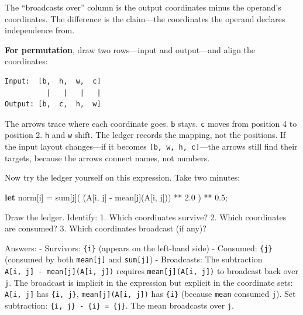 \documentclass[11pt,titlepage]{article}
\newenvironment{Shaded}{}{}
\newcommand{\DecValTok}[1]{\textcolor[rgb]{0.25,0.63,0.44}{#1}}
\newcommand{\KeywordTok}[1]{\textcolor[rgb]{0.00,0.44,0.13}{\textbf{#1}}}
\newcommand{\NormalTok}[1]{#1}
\newcommand{\OperatorTok}[1]{\textcolor[rgb]{0.40,0.40,0.40}{#1}}
\begin{document}
The ``broadcasts over'' column is the output coordinates minus the
operand's coordinates. The difference is the claim---the coordinates the
operand declares independence from.

\textbf{For permutation}, draw two rows---input and output---and align
the coordinates:

\begin{verbatim}
Input:  [b,  h,  w,  c]
          |   |   |   |
Output: [b,  c,  h,  w]
\end{verbatim}

The arrows trace where each coordinate goes. \texttt{b} stays.
\texttt{c} moves from position 4 to position 2. \texttt{h} and
\texttt{w} shift. The ledger records the mapping, not the positions. If
the input layout changes---if it becomes
\texttt{{[}b,\ w,\ h,\ c{]}}---the arrows still find their targets,
because the arrows connect names, not numbers.

Now try the ledger yourself on this expression. Take two minutes:

\begin{Shaded}
\begin{Highlighting}[]
\KeywordTok{let}\NormalTok{ norm}\OperatorTok{[}\NormalTok{i}\OperatorTok{]}\NormalTok{ = sum}\OperatorTok{[}\NormalTok{j}\OperatorTok{]}\NormalTok{( (A}\OperatorTok{[}\NormalTok{i, j}\OperatorTok{]}\NormalTok{ - mean}\OperatorTok{[}\NormalTok{j}\OperatorTok{]}\NormalTok{(A}\OperatorTok{[}\NormalTok{i, j}\OperatorTok{]}\NormalTok{)) ** }\DecValTok{2.0}\NormalTok{ ) ** }\DecValTok{0.5}\NormalTok{;}
\end{Highlighting}
\end{Shaded}

Draw the ledger. Identify: 1. Which coordinates survive? 2. Which
coordinates are consumed? 3. Which coordinates broadcast (if any)?

Answers: - Survivors: \texttt{\{i\}} (appears on the left-hand side) -
Consumed: \texttt{\{j\}} (consumed by both \texttt{mean{[}j{]}} and
\texttt{sum{[}j{]}}) - Broadcasts: The subtraction
\texttt{A{[}i,\ j{]}\ -\ mean{[}j{]}(A{[}i,\ j{]})} requires
\texttt{mean{[}j{]}(A{[}i,\ j{]})} to broadcast back over \texttt{j}.
The broadcast is implicit in the expression but explicit in the
coordinate sets: \texttt{A{[}i,\ j{]}} has \texttt{\{i,\ j\}},
\texttt{mean{[}j{]}(A{[}i,\ j{]})} has \texttt{\{i\}} (because
\texttt{mean} consumed \texttt{j}). Set subtraction:
\texttt{\{i,\ j\}\ -\ \{i\}\ =\ \{j\}}. The mean broadcasts over
\texttt{j}.
\end{document}
